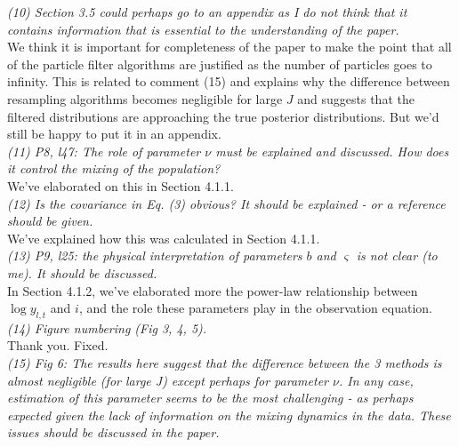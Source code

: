 \documentclass{article}
\begin{document}
\noindent \emph{(10) Section 3.5 could perhaps go to an appendix as I do not think that it contains information that is essential to the understanding of the paper.} \\

We think it is important for completeness of the paper to make the point that all of the particle filter algorithms are justified as the number of particles goes to infinity. This is related to comment (15) and explains why the difference between resampling algorithms becomes negligible for large $J$ and suggests that the filtered distributions are approaching the true posterior distributions. But we'd still be happy to put it in an appendix. \\

\noindent \emph{(11) P8, l47: The role of parameter $\nu$ must be explained and discussed. How does it control the mixing of the population?} \\

We've elaborated on this in Section 4.1.1. \\

\noindent \emph{(12) Is the covariance in Eq. (3) obvious? It should be explained - or a reference should be given.} \\

We've explained how this was calculated in Section 4.1.1. \\

\noindent \emph{(13) P9, l25: the physical interpretation of parameters $b$ and $\varsigma$ is not clear (to me). It should be discussed.} \\

In Section 4.1.2, we've elaborated more  the power-law relationship between $\log y_{l,t}$ and $i$, and the role these parameters play in the observation equation. \\

\noindent \emph{(14) Figure numbering (Fig 3, 4, 5).} \\

Thank you. Fixed. \\

\noindent \emph{(15) Fig 6: The results here suggest that the difference between the 3 methods is almost negligible (for large J) except perhaps for parameter $\nu$. In any case, estimation of this parameter seems to be the most challenging - as perhaps expected given the lack of information on the mixing dynamics in the data. These issues should be discussed in the paper.} \\
\end{document}
